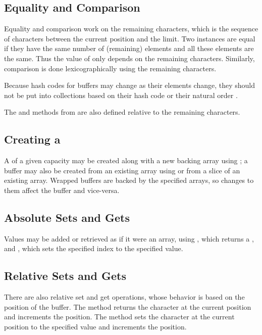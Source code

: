 \subsection{Equality and Comparison}

Equality and comparison work on the remaining characters, which is the
sequence of characters between the current position and the limit.
Two  instances are equal if they have the same number
of (remaining) elements and all these elements are the same.  Thus the
value of  only depends on the remaining characters.
Similarly, comparison is done lexicographically using the remaining
characters.

Because hash codes for buffers may change as their elements change,
they should not be put into collections based on their hash code
 or their natural order
.

The  and  methods from 
are also defined relative to the remaining characters.


\subsection{Creating a }

A  of a given capacity may be created along with
a new backing array using
; a buffer may also be created from
an existing array using  or from a slice
of an existing array.  Wrapped buffers are backed by the specified
arrays, so changes to them affect the buffer and vice-versa.

\subsection{Absolute Sets and Gets}

Values may be added or retrieved as if it were an array, using
, which returns a
, and , which sets the specified index
to the specified  value.

\subsection{Relative Sets and Gets}

There are also relative set and get operations, whose behavior is
based on the position of the buffer.  The  method returns
the character at the current position and increments the position.
The  method sets the character at the current position
to the specified value and increments the position.  

